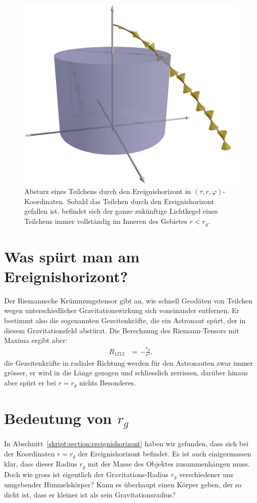 \begin{figure}
\centering
\includegraphics[width=\hsize]{chapters/3d/blackhole.jpg}
\caption{Absturz eines Teilchens durch den Ereignishorizont in
$(\tau,r,\varphi)$-Koordinaten.
Sobald das Teilchen durch den Ereignishorizont gefallen ist,
befindet sich der ganze zukünftige Lichtkegel eines Teilchens 
immer vollständig im Inneren des Gebietes $r<r_g$.
\label{skript:kruemmung:fig:blackhole}}
\end{figure}


\section{Was spürt man am Ereignishorizont?%
\label{skript:section:wasspuertman}}
Der Riemannsche Krümmungstensor gibt an, wie schnell Geodäten von Teilchen
wegen unterschiedlicher Gravitationswirkung sich voneinander entfernen.
Er bestimmt also die sogenannten Gezeitenkräfte, die ein Astronaut spürt,
der in diesem Gravitationsfeld abstürzt.
%
Die Berechnung des Riemann-Tensors mit Maxima ergibt aber:
\begin{align*}
R_{1212}&=-\frac{r_g}{r^3},
\end{align*}
die Gezeitenkräfte in radialer Richtung werden für den Astronauten
zwar immer grösser, er wird in die Länge gezogen und schliesslich 
zerrissen, darüber hinaus aber spürt er bei $r=r_g$ nichts Besonderes.
%

\section{Bedeutung von $r_g$%
\label{skript:schwarzschild:rg}}
In Abschnitt~\ref{skript:section:ereignishorizont} haben wir gefunden,
dass sich bei der Koordinaten $r=r_g$ der Ereignishorizont befindet.
Es ist auch einigermassen klar, dass dieser Radius $r_g$ mit der
Masse des Objektes zusammenhängen muss.
Doch wie gross ist eigentlich der Gravitations-Radius $r_g$ verschiedener
uns umgebender Himmelskörper? Kann es überhaupt einen Körper geben, der
so dicht ist, dass er kleiner ist als sein Gravitationsradius?

